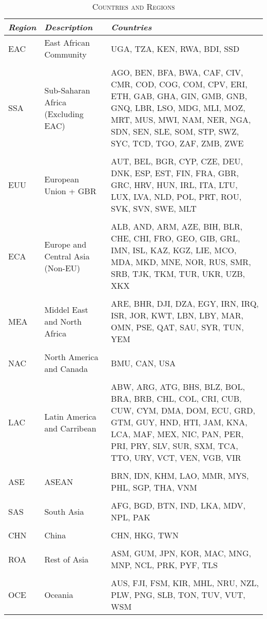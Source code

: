 \documentclass[a4paper]{article}
\begin{document}
\begin{table}[h!]
\centering
\caption{\textsc{Countries and Regions}}

\label{tab:ctry}
\vspace{2mm}
\begin{tabular}{llp{6cm}} \toprule
\textit{Region} & \textit{Description} & \textit{Countries} \\ \midrule
EAC & East African Community & UGA, TZA, KEN, RWA, BDI, SSD \\ \\
SSA & Sub-Saharan Africa (Excluding EAC) & AGO, BEN, BFA, BWA, CAF, CIV, CMR, COD, COG, COM, CPV, ERI, ETH, GAB, GHA, GIN, GMB, GNB, GNQ, LBR, LSO, MDG, MLI, MOZ, MRT, MUS, MWI, NAM, NER, NGA, SDN, SEN, SLE, SOM, STP, SWZ, SYC, TCD, TGO, ZAF, ZMB, ZWE \\ \\
EUU & European Union + GBR & AUT, BEL, BGR, CYP, CZE, DEU, DNK, ESP, EST, FIN, FRA, GBR, GRC, HRV, HUN, IRL, ITA, LTU, LUX, LVA, NLD, POL, PRT, ROU, SVK, SVN, SWE, MLT \\ \\
ECA & Europe and Central Asia (Non-EU) & ALB, AND, ARM, AZE, BIH, BLR, CHE, CHI, FRO, GEO, GIB, GRL, IMN, ISL, KAZ, KGZ, LIE, MCO, MDA, MKD, MNE, NOR, RUS, SMR, SRB, TJK, TKM, TUR, UKR, UZB, XKX \\ \\
MEA & Middel East and North Africa & ARE, BHR, DJI, DZA, EGY, IRN, IRQ, ISR, JOR, KWT, LBN, LBY, MAR, OMN, PSE, QAT, SAU, SYR, TUN, YEM \\ \\
NAC & North America and Canada & BMU, CAN, USA \\ \\
LAC & Latin America and Carribean & ABW, ARG, ATG, BHS, BLZ, BOL, BRA, BRB, CHL, COL, CRI, CUB, CUW, CYM, DMA, DOM, ECU, GRD, GTM, GUY, HND, HTI, JAM, KNA, LCA, MAF, MEX, NIC, PAN, PER, PRI, PRY, SLV, SUR, SXM, TCA, TTO, URY, VCT, VEN, VGB, VIR \\ \\
ASE & ASEAN & BRN, IDN, KHM, LAO, MMR, MYS, PHL, SGP, THA, VNM \\ \\
SAS & South Asia & AFG, BGD, BTN, IND, LKA, MDV, NPL, PAK \\ \\
CHN & China & CHN, HKG, TWN \\ \\
ROA & Rest of Asia & ASM, GUM, JPN, KOR, MAC, MNG, MNP, NCL, PRK, PYF, TLS \\ \\
OCE & Oceania & AUS, FJI, FSM, KIR, MHL, NRU, NZL, PLW, PNG, SLB, TON, TUV, VUT, WSM
 \\ \bottomrule
\end{tabular}
\end{table}
\FloatBarrier
\end{document}
